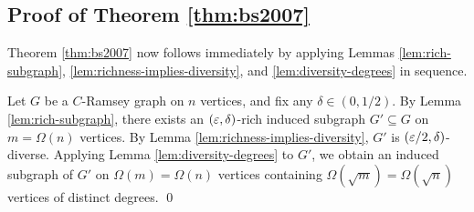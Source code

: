 \subsection{Proof of Theorem \ref{thm:bs2007}}

Theorem \ref{thm:bs2007} now follows immediately by applying Lemmas \ref{lem:rich-subgraph}, \ref{lem:richness-implies-diversity}, and \ref{lem:diversity-degrees} in sequence.

Let $G$ be a $C$-Ramsey graph on $n$ vertices, and fix any $\delta \in (0, 1/2)$. By Lemma \ref{lem:rich-subgraph}, there exists an $(\varepsilon, \delta)$-rich induced subgraph $G' \subseteq G$ on $m = \Omega(n)$ vertices. By Lemma \ref{lem:richness-implies-diversity}, $G'$ is $(\varepsilon/2, \delta)$-diverse. Applying Lemma \ref{lem:diversity-degrees} to $G'$, we obtain an induced subgraph of $G'$ on $\Omega(m) = \Omega(n)$ vertices containing $\Omega(\sqrt{m}) = \Omega(\sqrt{n})$ vertices of distinct degrees. \qed